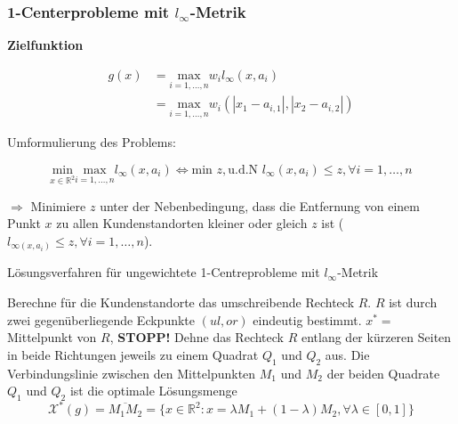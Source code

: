       \subsubsection{1-Centerprobleme mit $l_{\infty}$-Metrik} %
      \label{ssub:_1_centerprobleme_mit_}

        \par \textbf{Zielfunktion}

        \begin{equation}
          \begin{aligned}
            g(x) &= \underset{i = 1, \dots, n}{\text{max}}w_il_{\infty}(x, a_i) \\
                 &= \underset{i = 1, \dots, n}{\text{max}}w_i(\left| x_1 - a_{i,1}\right|, \left| x_2 - a_{i,2}\right|)  
          \end{aligned}
        \end{equation}


          \par Umformulierung des Problems:

          \begin{equation*}
            \underset{x \in \mathbb{R}^2}{\text{min}} \underset{i = 1, \dots, n}{\text{max}}l_{\infty}(x, a_i) \Leftrightarrow \underset{}{\text{min } z}, \text{u.d.N } l_{\infty}(x, a_i) \leq z, \forall i = 1, \dots, n
          \end{equation*}

          $\Rightarrow$ Minimiere $z$ unter der Nebenbedingung, dass die Entfernung von einem Punkt $x$ zu allen Kundenstandorten kleiner oder gleich $z$ ist ($l_{\infty(x, a_i)} \leq z, \forall i = 1, \dots, n$).


          \begin{algorithm}[H]
            \caption{Lösungsverfahren für ungewichtete 1-Centreprobleme mit $l_{\infty}$-Metrik}
            \begin{algorithmic}[1]
              \State Berechne für die Kundenstandorte das umschreibende Rechteck $R$. $R$ ist durch zwei gegenüberliegende Eckpunkte $(ul, or)$ eindeutig bestimmt.
                \State $x^*=$Mittelpunkt von $R$, \textbf{STOPP!}
              \Else
                \State Dehne das Rechteck $R$ entlang der kürzeren Seiten in beide Richtungen jeweils zu einem Quadrat $Q_1$ und $Q_2$ aus.  
                \State Die Verbindungslinie zwischen den Mittelpunkten $M_1$ und $M_2$ der beiden Quadrate $Q_1$ und $Q_2$ ist die optimale Lösungsmenge
                \begin{equation}
                  \mathcal{X}^*(g) = \overline{M_1M_2} = \{x \in \mathbb{R}^2: x = \lambda M_1 + (1 - \lambda)M_2, \forall \lambda \in [0, 1]\}
                \end{equation}
              \EndIf
            \end{algorithmic}
          \end{algorithm}

